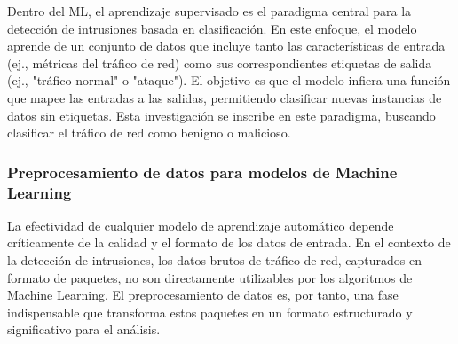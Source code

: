 Dentro del ML, el aprendizaje supervisado es el paradigma central para la detección de intrusiones basada en clasificación. En este enfoque, el modelo aprende de un conjunto de datos que incluye tanto las características de entrada (ej., métricas del tráfico de red) como sus correspondientes etiquetas de salida (ej., "tráfico normal" o "ataque"). El objetivo es que el modelo infiera una función que mapee las entradas a las salidas, permitiendo clasificar nuevas instancias de datos sin etiquetas. Esta investigación se inscribe en este paradigma, buscando clasificar el tráfico de red como benigno o malicioso.

\subsubsection{Preprocesamiento de datos para modelos de Machine Learning}

La efectividad de cualquier modelo de aprendizaje automático depende críticamente de la calidad y el formato de los datos de entrada. En el contexto de la detección de intrusiones, los datos brutos de tráfico de red, capturados en formato de paquetes, no son directamente utilizables por los algoritmos de Machine Learning. El preprocesamiento de datos es, por tanto, una fase indispensable que transforma estos paquetes en un formato estructurado y significativo para el análisis.

